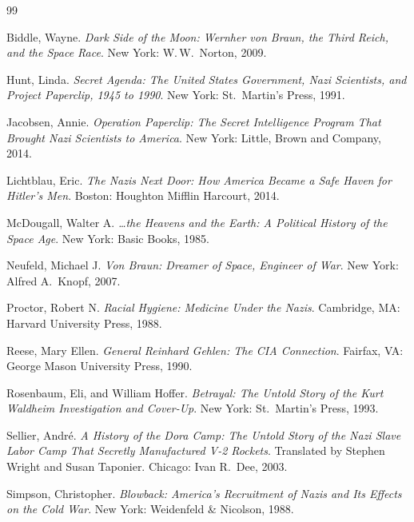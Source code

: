 \documentclass[11pt,a4paper]{article}
\begin{document}
\newpage
\begin{thebibliography}{99}


Biddle, Wayne.
\textit{Dark Side of the Moon: Wernher von Braun, the Third Reich, and the Space Race}.
New York: W.\,W.\ Norton, 2009.

Hunt, Linda.
\textit{Secret Agenda: The United States Government, Nazi Scientists, and Project Paperclip, 1945 to 1990}.
New York: St.\ Martin's Press, 1991.

Jacobsen, Annie.
\textit{Operation Paperclip: The Secret Intelligence Program That Brought Nazi Scientists to America}.
New York: Little, Brown and Company, 2014.

Lichtblau, Eric.
\textit{The Nazis Next Door: How America Became a Safe Haven for Hitler's Men}.
Boston: Houghton Mifflin Harcourt, 2014.

McDougall, Walter A.
\textit{\ldots the Heavens and the Earth: A Political History of the Space Age}.
New York: Basic Books, 1985.

Neufeld, Michael J.
\textit{Von Braun: Dreamer of Space, Engineer of War}.
New York: Alfred A.\ Knopf, 2007.

Proctor, Robert N.
\textit{Racial Hygiene: Medicine Under the Nazis}.
Cambridge, MA: Harvard University Press, 1988.

Reese, Mary Ellen.
\textit{General Reinhard Gehlen: The CIA Connection}.
Fairfax, VA: George Mason University Press, 1990.

Rosenbaum, Eli, and William Hoffer.
\textit{Betrayal: The Untold Story of the Kurt Waldheim Investigation and Cover-Up}.
New York: St.\ Martin's Press, 1993.

Sellier, Andr\'{e}.
\textit{A History of the Dora Camp: The Untold Story of the Nazi Slave Labor Camp That Secretly Manufactured V-2 Rockets}.
Translated by Stephen Wright and Susan Taponier.
Chicago: Ivan R.\ Dee, 2003.

Simpson, Christopher.
\textit{Blowback: America's Recruitment of Nazis and Its Effects on the Cold War}.
New York: Weidenfeld \& Nicolson, 1988.


\end{thebibliography}
\end{document}

